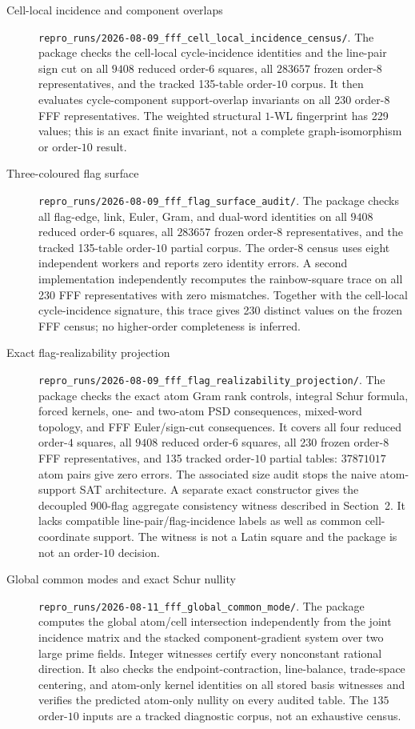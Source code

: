 \begin{description}
\item[Cell-local incidence and component overlaps]
\nolinkurl{repro_runs/2026-08-09_fff_cell_local_incidence_census/}.
The package checks the cell-local cycle-incidence identities and the
line-pair sign cut on all $9408$ reduced
order-$6$ squares, all $283657$ frozen order-$8$ representatives, and the
tracked 135-table order-$10$ corpus.  It then evaluates cycle-component
support-overlap invariants on all 230 order-$8$ FFF representatives.  The
weighted structural $1$-WL fingerprint has 229 values; this is an exact
finite invariant, not a complete graph-isomorphism or order-$10$ result.

\item[Three-coloured flag surface]
\nolinkurl{repro_runs/2026-08-09_fff_flag_surface_audit/}.
The package checks all flag-edge, link, Euler, Gram, and dual-word identities
on all $9408$ reduced order-$6$ squares, all $283657$ frozen order-$8$
representatives, and the tracked 135-table order-$10$ partial corpus.  The
order-$8$ census uses eight independent workers and reports zero identity
errors.  A second implementation independently recomputes the rainbow-square
trace on all 230 FFF representatives with zero mismatches.  Together with
the cell-local cycle-incidence signature, this trace gives 230 distinct
values on the frozen FFF
census; no higher-order completeness is inferred.

\item[Exact flag-realizability projection]
\nolinkurl{repro_runs/2026-08-09_fff_flag_realizability_projection/}.
The package checks the exact atom Gram rank controls, integral Schur formula,
forced kernels, one- and two-atom PSD consequences, mixed-word topology, and
FFF Euler/sign-cut consequences.  It covers all four reduced order-$4$
squares, all $9408$ reduced order-$6$ squares, all 230 frozen order-$8$ FFF
representatives, and 135 tracked order-$10$ partial tables: $37871017$ atom
pairs give zero errors.  The associated size audit stops the naive
atom-support SAT architecture.  A separate exact constructor gives the
decoupled $900$-flag aggregate consistency witness described in Section~2.
It lacks compatible line-pair/flag-incidence labels as well as common
cell-coordinate support.  The witness is not a Latin square and the package
is not an order-$10$ decision.

\item[Global common modes and exact Schur nullity]
\nolinkurl{repro_runs/2026-08-11_fff_global_common_mode/}.
The package computes the global atom/cell intersection independently from
the joint incidence matrix and the stacked component-gradient system over
two large prime fields.  Integer witnesses certify every nonconstant
rational direction.  It also checks the endpoint-contraction, line-balance,
trade-space centering, and atom-only kernel identities on all stored basis
witnesses and verifies the predicted atom-only nullity on every audited
table.  The $135$ order-$10$ inputs are a tracked diagnostic corpus, not an
exhaustive census.


\end{description}
